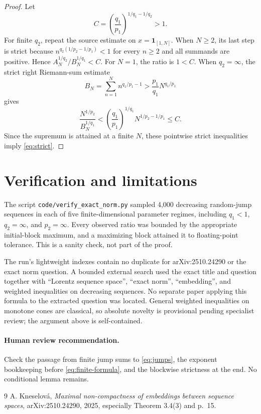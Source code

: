 \documentclass[11pt]{article}
\newcommand{\ind}{\mathbf{1}}
\begin{document}
\begin{proof}
Let
\[
 C=\left(\frac{q_1}{p_1}\right)^{1/q_1-1/q_2}>1.
\]
For finite $q_2$, repeat the source estimate on
$x=\ind_{[1,N]}$. When $N\geq2$, its last step is strict because
$n^{q_2(1/p_2-1/p_1)}<1$ for every $n\geq2$ and all summands are positive.
Hence
$A_N^{1/q_2}/B_N^{1/q_1}<C$. For $N=1$, the ratio is $1<C$.
When $q_2=\infty$, the strict right Riemann-sum estimate
\[
 B_N=\sum_{n=1}^Nn^{q_1/p_1-1}
 >\frac{p_1}{q_1}N^{q_1/p_1}
\]
gives
\[
 \frac{N^{1/p_2}}{B_N^{1/q_1}}
 <\left(\frac{q_1}{p_1}\right)^{1/q_1}
 N^{1/p_2-1/p_1}
 \leq C.
\]
Since the supremum is attained at a finite $N$, these pointwise strict
inequalities imply \eqref{eq:strict}.
\end{proof}

\section{Verification and limitations}

The script \texttt{code/verify\_exact\_norm.py} sampled 4,000 decreasing
random-jump sequences in each of five finite-dimensional parameter regimes,
including $q_1<1$, $q_2=\infty$, and $p_2=\infty$. Every observed ratio was
bounded by the appropriate initial-block maximum, and a maximizing block
attained it to floating-point tolerance. This is a sanity check, not part of
the proof.

The run's lightweight indexes contain no duplicate for arXiv:2510.24290 or
the exact norm question. A bounded external search used the exact title and
question together with ``Lorentz sequence space'', ``exact norm'',
``embedding'', and weighted inequalities on decreasing sequences. No separate
paper applying this formula to the extracted question was located. General
weighted inequalities on monotone cones are classical, so absolute novelty is
provisional pending specialist review; the argument above is self-contained.

\paragraph{Human review recommendation.}
Check the passage from finite jump sums to \eqref{eq:jumps}, the exponent
bookkeeping before \eqref{eq:finite-formula}, and the blockwise strictness at
the end. No conditional lemma remains.

\begin{thebibliography}{9}
A. Kneselov\'a,
\emph{Maximal non-compactness of embeddings between sequence spaces},
arXiv:2510.24290, 2025, especially Theorem 3.4(3) and p.~15.
\end{thebibliography}
\end{document}
